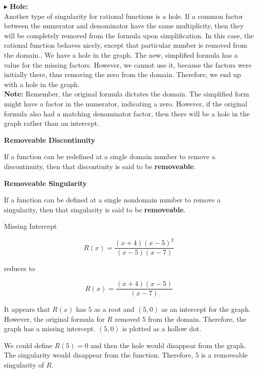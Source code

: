 \documentclass{ximera}
\begin{document}
$\blacktriangleright$ \textbf{\textcolor{red!10!blue!90!}{Hole:}} \\
Another type of singularity for rational functions is a hole. If a common factor between the numerator and denominator have the same multiplicity, then they will be completely removed from the formula upon simplification.  In this case, the rational function behaves nicely, except that particular number is removed from the domain..  We have a hole in the graph.  The new, simplified formula has a value for the missing factors.  However, we cannot use it, because the factors were initially there, thus removing the zero from the domain.  Therefore, we end up with a hole in the graph. \\



\textbf{Note:} Remember, the original formula dictates the domain. The simplified form might have a factor in the numerator, indicating a zero. However, if the original formula also had a matching denominator factor, then there will be a hole in the graph rather than an intercept. 




\begin{definition} \textbf{\textcolor{green!50!black}{Removeable Discontinuity}}

If a function can be redefined at a single domain number to remove a discontinuity, then that discontiuity is said to be \textbf{removeable}.

\end{definition}





\begin{definition} \textbf{\textcolor{green!50!black}{Removeable Singularity}}

If a function can be defined at a single nondomain number to remove a singularity, then that singularity is said to be \textbf{removeable}.

\end{definition}






\begin{example}  Missing Intercept

\[     R(x) = \frac{(x+4)(x-5)^2}{(x-5)(x-7)}     \]

reduces to 

\[     R(x) = \frac{(x+4)(x-5)}{(x-7)}     \]


It appears that $R(x)$ has $5$ as a root and $(5,0)$ as an intercept for the graph.  However, the original formula for $R$ removed $5$ from the domain.  Therefore, the graph has a missing intercept. $(5,0)$ is plotted as a hollow dot.



We could define $R(5)=0$ and then the hole would disappear from the graph.  The singularity would disappear from the function. Therefore, $5$ is a removeable singularity of $R$.


\end{example}
\end{document}
